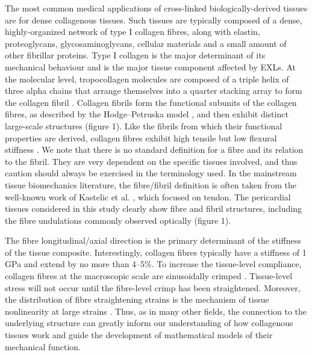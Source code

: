     The most common medical applications of cross-linked biologically-derived tissues are for dense collagenous tissues. Such tissues are typically composed of a dense, highly-organized network of type I collagen fibres, along with elastin, proteoglycans, glycosaminoglycans, cellular materials and a small amount of other fibrillar proteins. Type I collagen is the major determinant of its mechanical behaviour \cite{parry_molecular_1988}\cite{gelse_collagens_2003} and is the major tissue component affected by EXLs. At the molecular level, tropocollagen molecules are composed of a triple helix of three alpha chains \cite{parry_molecular_1988}\cite{gelse_collagens_2003} that arrange themselves into a quarter stacking array to form the collagen fibril \cite{parry_molecular_1988}\cite{gelse_collagens_2003}. Collagen fibrils form the functional subunits of the collagen fibres, as described by the Hodge–Petruska model \cite{parry_molecular_1988}\cite{petruska_subunit_1964}, and then exhibit distinct large-scale structures (figure 1). Like the fibrils from which their functional properties are derived, collagen fibres exhibit high tensile but low flexural stiffness \cite{sacks_biomechanics_2009}. We note that there is no standard definition for a fibre and its relation to the fibril. They are very dependent on the specific tissues involved, and thus caution should always be exercised in the terminology used. In the mainstream tissue biomechanics literature, the fibre/fibril definition is often taken from the well-known work of Kastelic et al. \cite{nimni_collagen_2018}, which focused on tendon. The pericardial tissues considered in this study clearly show fibre and fibril structures, including the fibre undulations commonly observed optically \cite{shen_stress_2008} (figure 1).
    
    
    The fibre longitudinal/axial direction is the primary determinant of the stiffness of the tissue composite. Interestingly, collagen fibres typically have a stiffness of 1 GPa \cite{shen_stress_2008}\cite{gentleman_mechanical_2003}\cite{eppell_nano_2006}\cite{yang_mechanical_2008} and extend by no more than 4–5\%. 
    To increase the tissue-level compliance, collagen fibres at the macroscopic scale are sinusoidally crimped \cite{parry_molecular_1988}. Tissue-level stress will not occur until the fibre-level crimp has been straightened. Moreover, the distribution of fibre straightening strains is the mechanism of tissue nonlinearity at large strains \cite{lanir_constitutive_1983}\cite{sacks_multiaxial_2003}. Thus, as in many other fields, the connection to the underlying structure can greatly inform our understanding of how collagenous tissues work and guide the development of mathematical models of their mechanical function.


